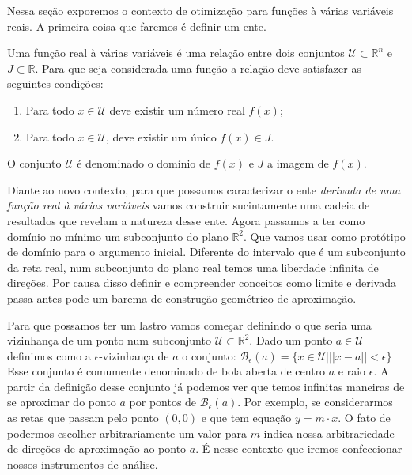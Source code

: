 \noindent
Nessa seção exporemos o contexto de otimização para funções à várias variáveis reais. A primeira coisa que faremos é definir um ente.

\begin{definition}
  Uma função real à várias variáveis é uma relação entre dois conjuntos $\mathcal{U} \subset \mathbb{R}^n$ e $J \subset \mathbb{R}$. Para que seja considerada uma função a relação deve satisfazer as seguintes condições:				
  \begin{enumerate}
  \item Para todo $x \in \mathcal{U}$ deve existir um número real $f(x)$;
  \item Para todo $x \in \mathcal{U}$, deve existir um único $f(x) \in J$.
  \end{enumerate}
  O conjunto $\mathcal{U}$ é denominado o domínio de $f(x)$ e $J$ a imagem de $f(x)$.
\end{definition}


\par Diante ao novo contexto, para que possamos caracterizar o ente \textit{derivada de uma função real à várias variáveis} vamos construir sucintamente uma cadeia de resultados que revelam a natureza desse ente. Agora passamos a ter como domínio no mínimo um subconjunto do plano $\mathbb{R}^2$. Que vamos usar como protótipo de domínio para o argumento inicial. Diferente do intervalo que é um subconjunto da reta real, num subconjunto do plano real temos uma liberdade infinita de direções. Por causa disso definir e compreender conceitos como limite e derivada passa antes pode um barema de construção geométrico de aproximação. 

\par Para que possamos ter um lastro vamos começar definindo o que seria uma vizinhança de um ponto num subconjunto $\mathcal{U} \subset \mathbb{R}^2$. Dado um ponto $a \in \mathcal{U}$ definimos como a $\epsilon$-vizinhança de $a$ o conjunto: $\mathcal{B}_{\epsilon}(a) = \{x \in \mathcal{U} | ||x - a|| < \epsilon\}$ Esse conjunto é comumente denominado de bola aberta de centro $a$ e raio $\epsilon$. A partir da definição desse conjunto já podemos ver que temos infinitas maneiras de se aproximar do ponto $a$ por pontos de $\mathcal{B}_{\epsilon}(a)$. Por exemplo, se considerarmos as retas que passam pelo ponto $(0,0)$ e que tem equação $y = m \cdot x$. O fato de podermos escolher arbitrariamente um valor para $m$ indica nossa arbitrariedade de direções de aproximação ao ponto $a$. É nesse contexto que iremos confeccionar nossos instrumentos de análise.

